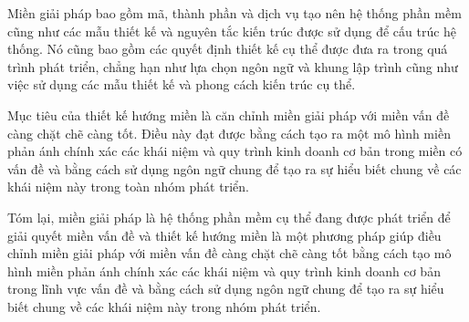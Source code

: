 Miền giải pháp bao gồm mã, thành phần và dịch vụ tạo nên hệ thống phần mềm cũng như các mẫu thiết kế và nguyên tắc kiến trúc được sử dụng để cấu trúc hệ thống. Nó cũng bao gồm các quyết định thiết kế cụ thể được đưa ra trong quá trình phát triển, chẳng hạn như lựa chọn ngôn ngữ và khung lập trình cũng như việc sử dụng các mẫu thiết kế và phong cách kiến trúc cụ thể.

Mục tiêu của thiết kế hướng miền là căn chỉnh miền giải pháp với miền vấn đề càng chặt chẽ càng tốt. Điều này đạt được bằng cách tạo ra một mô hình miền phản ánh chính xác các khái niệm và quy trình kinh doanh cơ bản trong miền có vấn đề và bằng cách sử dụng ngôn ngữ chung để tạo ra sự hiểu biết chung về các khái niệm này trong toàn nhóm phát triển.

Tóm lại, miền giải pháp là hệ thống phần mềm cụ thể đang được phát triển để giải quyết miền vấn đề và thiết kế hướng miền là một phương pháp giúp điều chỉnh miền giải pháp với miền vấn đề càng chặt chẽ càng tốt bằng cách tạo mô hình miền phản ánh chính xác các khái niệm và quy trình kinh doanh cơ bản trong lĩnh vực vấn đề và bằng cách sử dụng ngôn ngữ chung để tạo ra sự hiểu biết chung về các khái niệm này trong nhóm phát triển.

